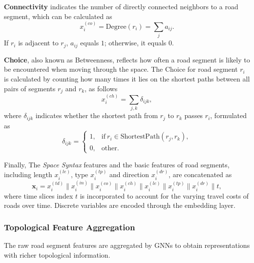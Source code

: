 \textbf{Connectivity} indicates the number of directly connected neighbors to a road segment, which can be calculated as
\begin{equation}
    x_i^{(co)} = \text{Degree}(r_i) = \sum_j a_{ij}.
\end{equation}
If $r_i$ is adjacent to $r_j$, $a_{ij}$ equals $1$; otherwise, it equals $0$.

\textbf{Choice}, also known as Betweenness, reflects how often a road segment is likely to be encountered when moving through the space. The Choice for road segment $r_i$ is calculated by counting how many times it lies on the shortest paths between all pairs of segments $r_j$ and $r_k$, as follows
\begin{equation}
    x_i^{(ch)} = \sum_{j,k}{\delta_{ijk}}, 
\end{equation}
where $\delta_{ijk}$ indicates whether the shortest path from $r_j$ to $r_k$ passes $r_i$, formulated as 
\begin{equation}
    \delta_{ijk} = 
    \begin{cases}
        1, & \text{if} \  r_i \in \text{ShortestPath}(r_j, r_k), \\
        0, & \text{other}.
    \end{cases}
\end{equation}

Finally, The \textit{Space Syntax} features and the basic features of road segments, including length $x_i^{(le)}$, type $x_i^{(tp)}$ and direction $x_i^{(dr)}$, are concatenated as
\begin{equation}
    \bm{x}_{i} = x_i^{(td)} \| x_i^{(in)} \| x_i^{(co)} \| x_i^{(ch)} \| x_i^{(le)} \| x_i^{(tp)} \| x_i^{(dr)} \| t,
\end{equation}
where time slices index $t$ is incorporated to account for the varying travel costs of roads over time. Discrete variables are encoded through the embedding layer.

\subsubsection{Topological Feature Aggregation}
The raw road segment features are aggregated by GNNs to obtain representations with richer topological information.

